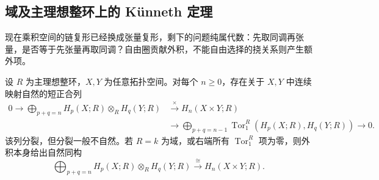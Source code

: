 \subsection{域及主理想整环上的 Künneth 定理}
\label{g2:subsec:0403:03}

现在乘积空间的链复形已经换成张量复形，剩下的问题纯属代数：先取同调再张量，是否等于先张量再取同调？自由圈贡献外积，不能自由选择的挠关系则产生额外项。

\begin{theorem}[Künneth 定理]\label{g2:thm:kunneth}
	设 \(R\) 为主理想整环，\(X,Y\) 为任意拓扑空间。对每个 \(n\ge0\)，存在关于 \(X,Y\) 中连续映射自然的短正合列
	\begin{equation}\label{g2:eq:kunneth-sequence}
		\begin{aligned}
			0\longrightarrow\bigoplus_{p+q=n}H_p(X;R)\otimes_R H_q(Y;R)
			&\xrightarrow{\ \times\ }H_n(X\times Y;R)\\
			&\longrightarrow\bigoplus_{p+q=n-1}\operatorname{Tor}_1^R(H_p(X;R),H_q(Y;R))\longrightarrow0.
		\end{aligned}
	\end{equation}
	该列分裂，但分裂一般不自然。若 \(R=k\) 为域，或右端所有 \(\operatorname{Tor}_1^R\) 项为零，则外积本身给出自然同构
	\[
		\bigoplus_{p+q=n}H_p(X;R)\otimes_R H_q(Y;R)
		\xrightarrow{\ \cong\ }H_n(X\times Y;R).
	\]
\end{theorem}
